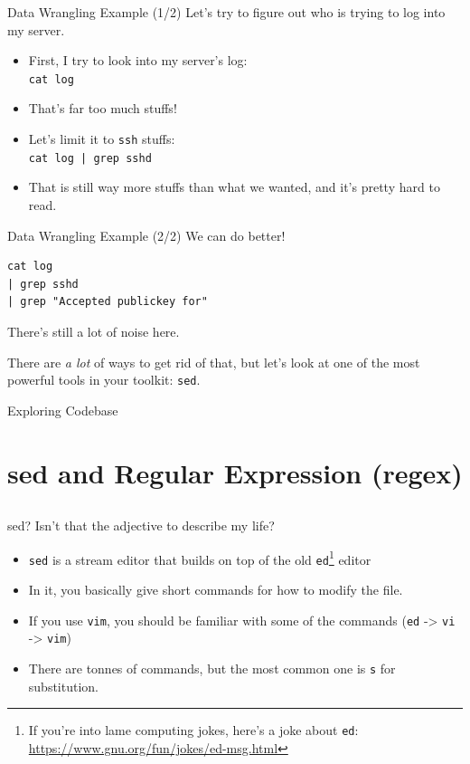 \documentclass[12pt]{beamer}
\begin{document}
\begin{frame}[fragile]{Data Wrangling Example (1/2)}
  Let's try to figure out who is trying to log into my server.
  \begin{itemize}
    \item First, I try to look into my server's log: \\\texttt{cat log}
    \item That's far too much stuffs!
    \item Let's limit it to \texttt{ssh} stuffs: \\\texttt{cat log | grep sshd}
    \item That is still way more stuffs than what we wanted, and it's pretty hard to read.
  \end{itemize}
\end{frame}

\begin{frame}[fragile]{Data Wrangling Example (2/2)}
  We can do better!
  \begin{verbatim}
cat log
| grep sshd
| grep "Accepted publickey for"
  \end{verbatim}
  There's still a lot of noise here.

  There are \emph{a lot} of ways to get rid of that, but let’s look at one of the most powerful tools in your toolkit: \texttt{sed}.
\end{frame}

\begin{frame}{Exploring Codebase}
\end{frame}

\section{sed and Regular Expression (regex)}
\subsection{}
\begin{frame}{sed? Isn't that the adjective to describe my life?}
  \begin{itemize}
    \item \texttt{sed} is a stream editor that builds on top of the old \texttt{ed}\footnote{If you're into lame computing jokes, here's a joke about \texttt{ed}: \url{https://www.gnu.org/fun/jokes/ed-msg.html}} editor
    \item In it, you basically give short commands for how to modify the file.
    \item If you use \texttt{vim}, you should be familiar with some of the commands (\texttt{ed} -> \texttt{vi} -> \texttt{vim})
    \item There are tonnes of commands, but the most common one is \texttt{s} for substitution.
  \end{itemize}
\end{frame}
\end{document}

